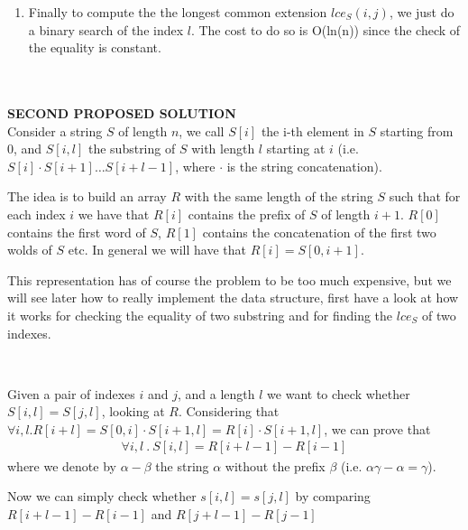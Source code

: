 \documentclass[a4paper]{article}
\begin{document}
\begin{enumerate}
\item Finally to compute the the longest common extension $lce_S(i, j)$, we just do a binary search of the index $l$. The cost to do so is O(ln(n)) since the check of the equality is constant.
\end{enumerate}

\newpage \qquad \\
\\
\textbf{SECOND PROPOSED SOLUTION}
\\
Consider a string $S$ of length $n$, we call $S[i]$ the i-th element in $S$ starting from $0$, and $S[i,l]$ the substring of $S$ with length $l$ starting at $i$ (i.e. $S[i] \cdot S[i+1] \dots S[i+l-1]$, where $\cdot$ is the string concatenation). 

The idea is to build an array $R$ with the same length of the string $S$ such that for each index $i$ we have that $R[i]$ contains the prefix of $S$ of length $i + 1$.
$R[0]$ contains the first word of $S$, $R[1]$ contains the concatenation of the first two wolds of $S$ etc.
In general we will have that $R[i] = S[0,i+1]$.

This representation has of course the problem to be too much expensive, but we will see later how to really implement the data structure, first have a look at how it works for checking the equality of two substring and for finding the $lce_S$ of two indexes.

\

\noindent
Given a pair of indexes $i$ and $j$, and a length $l$ we want to check whether $S[i,l] = S[j,l]$, looking at $R$.
Considering that $\forall i, l . R[i+l] = S[0,i] \cdot S[i+1,l] = R[i] \cdot S[i+1,l]$, we can prove that
\begin{align*}
\forall i, l\ .\ S[i, l] = R[i + l - 1] - R[i-1]
\end{align*}
where we denote by $\alpha - \beta$ the string $\alpha$ without the prefix $\beta$ (i.e. $\alpha\gamma - \alpha = \gamma$).

Now we can simply check whether $s[i,l] = s[j,l]$ by comparing $R[i + l - 1] - R[i-1]$ and $R[j + l - 1] - R[j-1]$

\
\end{document}
